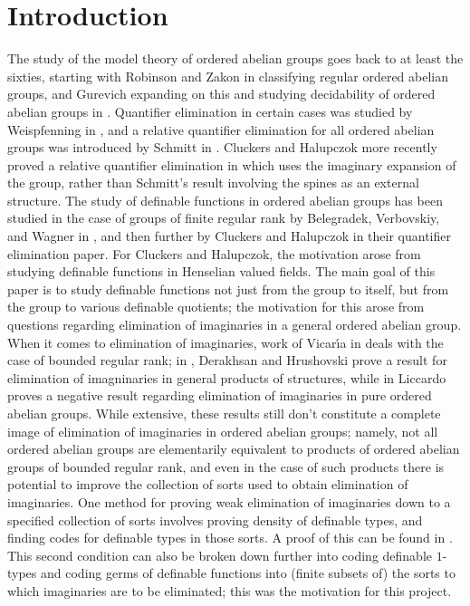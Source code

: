 \documentclass[a4paper,11pt]{article}
\newcommand{\nl}{\newline}
\begin{document}
\section{Introduction}
%
%
The study of the model theory of ordered abelian groups goes back to at least
the sixties, starting with Robinson and Zakon in \cite{RobinsonZakon}
classifying regular ordered abelian groups, and Gurevich expanding on this and
studying decidability of ordered abelian groups in \cite{Gurevic}. Quantifier
elimination in certain cases was studied by Weispfenning in
\cite{WeispfenningQE}, and a relative quantifier elimination for all ordered
abelian groups was introduced by Schmitt in \cite{SchmittHab}. Cluckers and
Halupczok more recently proved a relative quantifier elimination in \cite{QE}
which uses the imaginary expansion of the group, rather than Schmitt's result
involving the spines as an external structure. 
\nl\nl
The study of definable functions in ordered abelian groups has been studied in the case of groups of finite regular rank by Belegradek, Verbovskiy, and Wagner in \cite{CosetMinimal}, and then further by Cluckers and Halupczok in their quantifier elimination paper. For Cluckers and Halupczok, the motivation arose from studying definable functions in Henselian valued fields. The main goal of this paper is to study definable functions not just from the group to itself, but from the group to various definable quotients; the motivation for this arose from questions regarding elimination of imaginaries in a general ordered abelian group.
\nl\nl
When it comes to elimination of imaginaries, work of Vicar{\'{\i}}a in \cite{Mariana} deals with the case of bounded regular rank; in \cite{ImaginariesProductsAndAdeleRing}, Derakhsan and Hrushovski prove a result for elimination of imagninaries in general products of structures, while in \cite{noEI} Liccardo proves a negative result regarding elimination of imaginaries in pure ordered abelian groups. While extensive, these results still don't constitute a complete image of elimination of imaginaries in ordered abelian groups; namely, not all ordered abelian groups are elementarily equivalent to products of ordered abelian groups of bounded regular rank, and even in the case of such products there is potential to improve the collection of sorts used to obtain elimination of imaginaries.
\nl\nl
One method for proving weak elimination of imaginaries down to a specified collection of sorts involves proving density of definable types, and finding codes for definable types in those sorts. A proof of this can be found in \cite{ProofOfEI}. This second condition can also be broken down further into coding definable $1$-types and coding germs of definable functions into (finite subsets of) the sorts to which imaginaries are to be eliminated; this was the motivation for this project.
\end{document}

